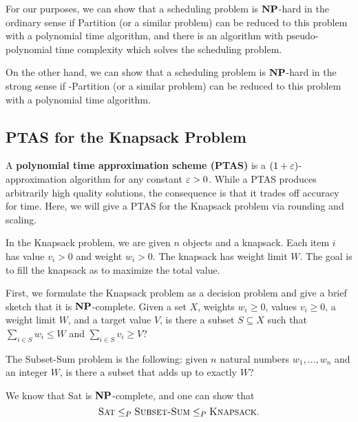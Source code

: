 For our purposes, we can show that a scheduling problem is $\operatorname{\textbf{NP}}$-hard 
in the ordinary sense if {\sc Partition} (or a similar problem) can be 
reduced to this problem with a polynomial time algorithm, and there 
is an algorithm with pseudo-polynomial time complexity which solves the 
scheduling problem. 

On the other hand, we can show that a scheduling problem is $\operatorname{\textbf{NP}}$-hard 
in the strong sense if {-Partition} (or a similar problem) can be 
reduced to this problem with a polynomial time algorithm. 

\subsection{PTAS for the Knapsack Problem}\label{subsec:3.3}
A {\bf polynomial time approximation scheme (PTAS)} is a
$(1 + \varepsilon)$-approximation algorithm for any constant $\varepsilon > 0$. 
While a PTAS produces arbitrarily high quality solutions, the consequence 
is that it trades off accuracy for time. Here, we will give a PTAS for the 
{\sc Knapsack} problem via rounding and scaling. 

In the {\sc Knapsack} problem, we are given $n$ objects and a knapsack. 
Each item $i$ has value $v_i > 0$ and weight $w_i > 0$. The knapsack 
has weight limit $W$. The goal is to fill the knapsack as to maximize 
the total value. 

First, we formulate the {\sc Knapsack} problem as a decision problem
and give a brief sketch that it is $\operatorname{\textbf{NP}}$-complete. 
Given a set $X$, weights $w_i \geq 0$, values $v_i \geq 0$, a weight 
limit $W$, and a target value $V$, is there a subset $S \subseteq X$ 
such that $\sum_{i\in S} w_i \leq W$ and $\sum_{i\in S} v_i \geq V$? 

The {\sc Subset-Sum} problem is the following: given $n$ natural numbers 
$w_1, \dots, w_n$ and an integer $W$, is there a subset that adds up to 
exactly $W$?

We know that {\sc Sat} is $\operatorname{\textbf{NP}}$-complete, and one can show that 
\[ \textsc{Sat} \leq_P \textsc{Subset-Sum} \leq_P \textsc{Knapsack}. \] 
